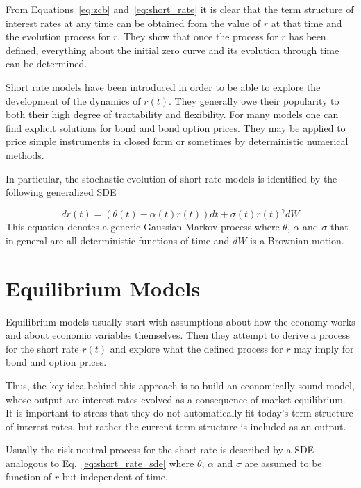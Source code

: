 
From Equations~\ref{eq:zcb} and~\ref{eq:short_rate} it is clear that the term structure of interest rates at any time can be obtained from the value of $r$ at that time and the evolution process for $r$. They show that once the process for $r$ has been defined, everything about the initial zero curve and its evolution through time can be determined.

Short rate models have been introduced in order to be able to explore the development of the dynamics of $r(t)$. They generally owe their popularity to both their high degree of tractability and flexibility. For many models one can find explicit solutions for bond and bond option prices. They may be applied to price simple instruments in closed form or sometimes by deterministic numerical methods.

In particular, the stochastic evolution of short rate models is identified by the following generalized SDE

\begin{equation}
dr(t) = (\theta(t)-\alpha(t)r(t)) dt + \sigma(t)r(t)^{\gamma} dW
\label{eq:short_rate_sde}
\end{equation}
This equation denotes a generic Gaussian Markov process where $\theta$, $\alpha$ and $\sigma$ that in general are all deterministic functions of time and $dW$ is a Brownian motion.

\section{Equilibrium Models}\label{equilibrium-models}

Equilibrium models usually start with assumptions about how the economy works and about economic variables themselves. Then they attempt to derive a process for the short rate $r(t)$ and explore what the defined process for $r$ may imply for bond and option prices.

Thus, the key idea behind this approach is to build an economically sound model, whose output are interest rates evolved as a consequence of market equilibrium. It is important to stress that they do not automatically fit today’s term structure of interest rates, but rather the current term structure is included as an output. 

Usually the risk-neutral process for the short rate is described by a SDE analogous to Eq.~\ref{eq:short_rate_sde} where $\theta$, $\alpha$ and $\sigma$ are assumed to be function of $r$ but independent of time.

